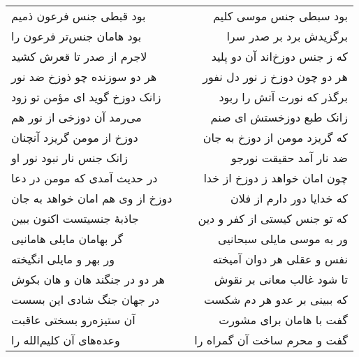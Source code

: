 \begin{center}
\begin{longtable}{l p{0.5cm} r}
بود قبطی جنس فرعون ذمیم
&&
بود سبطی جنس موسی کلیم
\\
بود هامان جنس‌تر فرعون را
&&
برگزیدش برد بر صدر سرا
\\
لاجرم از صدر تا قعرش کشید
&&
که ز جنس دوزخ‌اند آن دو پلید
\\
هر دو سوزنده چو ذوزخ ضد نور
&&
هر دو چون دوزخ ز نور دل نفور
\\
زانک دوزخ گوید ای مؤمن تو زود
&&
برگذر که نورت آتش را ربود
\\
می‌رمد آن دوزخی از نور هم
&&
زانک طبع دوزخستش ای صنم
\\
دوزخ از مومن گریزد آنچنان
&&
که گریزد مومن از دوزخ به جان
\\
زانک جنس نار نبود نور او
&&
ضد نار آمد حقیقت نورجو
\\
در حدیث آمدی که مومن در دعا
&&
چون امان خواهد ز دوزخ از خدا
\\
دوزخ از وی هم امان خواهد به جان
&&
که خدایا دور دارم از فلان
\\
جاذبهٔ جنسیتست اکنون ببین
&&
که تو جنس کیستی از کفر و دین
\\
گر بهامان مایلی هامانیی
&&
ور به موسی مایلی سبحانیی
\\
ور بهر و مایلی انگیخته
&&
نفس و عقلی هر دوان آمیخته
\\
هر دو در جنگند هان و هان بکوش
&&
تا شود غالب معانی بر نقوش
\\
در جهان جنگ شادی این بسست
&&
که ببینی بر عدو هر دم شکست
\\
آن ستیزه‌رو بسختی عاقبت
&&
گفت با هامان برای مشورت
\\
وعده‌های آن کلیم‌الله را
&&
گفت و محرم ساخت آن گمراه را
\\
\end{longtable}
\end{center}
